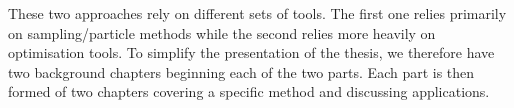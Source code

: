 These two approaches rely on different sets of tools. 
The first one relies primarily on sampling/particle methods while the second relies more heavily on optimisation tools. 
To simplify the presentation of the thesis, we therefore have two background chapters beginning each of the two parts. Each part is then formed of two chapters covering a specific method and discussing applications. 


%



